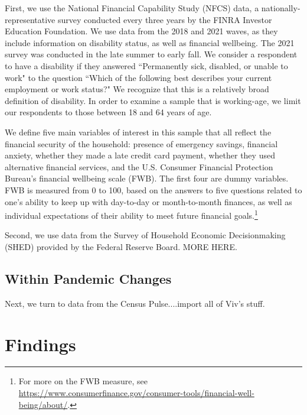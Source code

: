 \documentclass[12pt]{article}
\begin{document}
First, we use the National Financial Capability Study (NFCS) data, a nationally-representative survey conducted every three years by the FINRA Investor Education Foundation. We use data from the 2018 and 2021 waves, as they include information on disability status, as well as financial wellbeing. The 2021 survey was conducted in the late summer to early fall. We consider a respondent to have a disability if they answered ``Permanently sick, disabled, or unable to work" to the question ``Which of the following best describes your current employment or work status?" We recognize that this is a relatively broad definition of disability. In order to examine a sample that is working-age, we limit our respondents to those between 18 and 64 years of age. 

We define five main variables of interest in this sample that all reflect the financial security of the household: presence of emergency savings, financial anxiety, whether they made a late credit card payment, whether they used alternative financial services, and the U.S. Consumer Financial Protection Bureau's financial wellbeing scale (FWB). The first four are dummy variables. FWB is measured from 0 to 100, based on the answers to five questions related to one's ability to keep up with day-to-day or month-to-month finances, as well as individual expectations of their ability to meet future financial goals.\footnote{For more on the FWB measure, see \url{https://www.consumerfinance.gov/consumer-tools/financial-well-being/about/}.}  


Second, we use data from the Survey of Household Economic Decisionmaking (SHED) provided by the Federal Reserve Board. MORE HERE. 



\subsection{Within Pandemic Changes}
Next, we turn to data from the Census Pulse....import all of Viv's stuff. 


 

\section{Findings}
\end{document}
